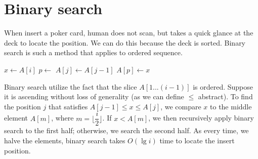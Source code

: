 \documentclass[b5paper]{article}
\begin{document}
\begin{Exercise}\label{ex:isort-insert}
\end{Exercise}

\begin{Answer}[ref = {ex:isort-insert}]
\end{Answer}

\section{Binary search}

When insert a poker card, human does not scan, but takes a quick glance at the deck to locate the position. We can do this because the deck is sorted. Binary search is such a method that applies to ordered sequence.

\begin{algorithmic}[1]
    \State $x \gets A[i]$
    \State $p \gets $ 
      \State $A[j] \gets A[j-1]$
    \EndFor
    \State $A[p] \gets x$
  \EndFor
\EndFunction
\end{algorithmic}

Binary search utilize the fact that the slice $A[1...(i-1)]$ is ordered. Suppose it is ascending without loss of generality (as we can define $\leq$ abstract). To find the position $j$ that satisfies $A[j-1] \leq x \leq A[j]$, we compare $x$ to the middle element $A[m]$, where $m = \lfloor \dfrac{i}{2} \rfloor$. If $x < A[m]$, we then recursively apply binary search to the first half; otherwise, we search the second half. As every time, we halve the elements, binary search takes $O(\lg i)$ time to locate the insert position.
\end{document}
